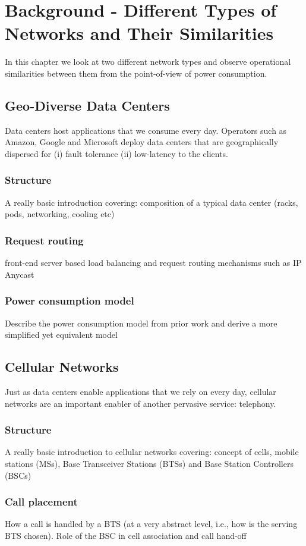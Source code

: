 \chapter{Background - Different Types of Networks and Their Similarities }
\label{chap:background}
In this chapter we look at two different network types and observe operational similarities between them from the point-of-view of power consumption.
\section{Geo-Diverse Data Centers} Data centers host applications that we consume every day. Operators such as Amazon, Google and Microsoft deploy data centers that are geographically dispersed for (i) fault tolerance (ii) low-latency to the clients.
\subsection{Structure}
A really basic introduction covering: composition of a typical data center (racks, pods, networking, cooling etc)
\subsection{Request routing} front-end server based load balancing and request routing mechanisms such as IP Anycast
\subsection{Power consumption model} Describe the power consumption model from prior work and derive a more simplified yet equivalent model

\section{Cellular Networks} Just as data centers enable applications that we rely on every day, cellular networks are an important enabler of another pervasive service: telephony. 
\subsection{Structure} A really basic introduction to cellular networks covering: concept of cells, mobile stations (MSs), Base Transceiver Stations (BTSs) and Base Station Controllers (BSCs) 
\subsection{Call placement} How a call is handled by a BTS (at a very abstract level, i.e., how is the serving BTS chosen). Role of the BSC in cell association and call hand-off
